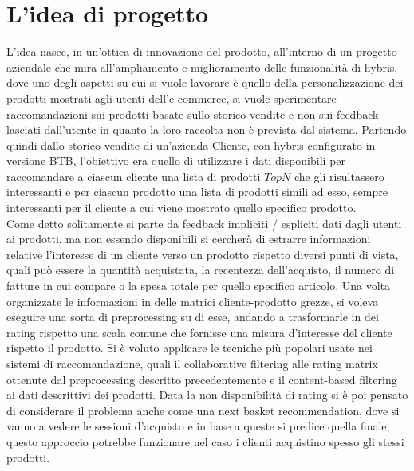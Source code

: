 \section{L'idea di progetto}
L'idea nasce, in un'ottica di innovazione del prodotto, all'interno di un progetto aziendale che mira all'ampliamento e miglioramento delle funzionalità di hybris, dove uno degli aspetti su cui si vuole lavorare è quello della personalizzazione dei prodotti mostrati agli utenti dell'e-commerce, si vuole sperimentare raccomandazioni sui prodotti basate sullo storico vendite e non sui feedback lasciati dall'utente in quanto la loro raccolta non è prevista dal sistema.
Partendo quindi dallo storico vendite di un'azienda Cliente, con hybris configurato in versione BTB, l'obiettivo era quello di utilizzare i dati disponibili per raccomandare a ciascun cliente una lista di prodotti $TopN$ che gli risultassero interessanti e per ciascun prodotto una lista di prodotti simili ad esso, sempre interessanti per il cliente a cui viene mostrato quello specifico prodotto.\\
Come detto solitamente si parte da feedback impliciti / espliciti dati dagli utenti ai prodotti, ma non essendo disponibili si cercherà di estrarre informazioni relative l'interesse di un cliente verso un prodotto rispetto diversi punti di vista, quali può essere la quantità acquistata, la recentezza dell'acquisto, il numero di fatture in cui compare o la spesa totale per quello specifico articolo.
Una volta organizzate le informazioni in delle matrici cliente-prodotto grezze, si voleva eseguire una sorta di preprocessing su di esse, andando a trasformarle in dei rating rispetto una scala comune che fornisse una misura d'interesse del cliente rispetto il prodotto. Si è voluto applicare le tecniche più popolari usate nei sistemi di raccomandazione, quali il collaborative filtering alle rating matrix ottenute dal preprocessing descritto precedentemente e il content-based filtering ai dati descrittivi dei prodotti.
Data la non disponibilità di rating si è poi pensato di considerare il problema anche come una next basket recommendation, dove si vanno a vedere le sessioni d'acquisto e in base a queste si predice quella finale, questo approccio potrebbe funzionare nel caso i clienti acquistino spesso gli stessi prodotti.

